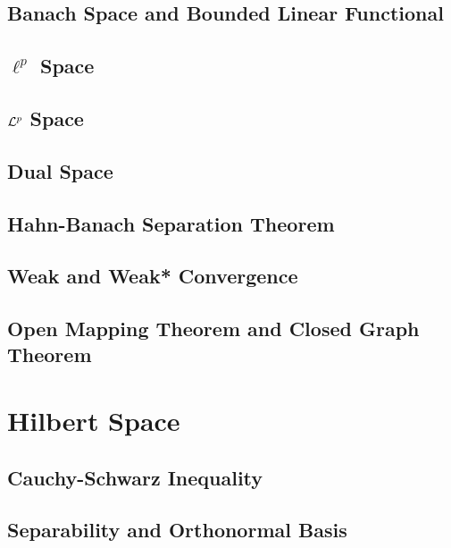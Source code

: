 \documentclass[a4paper, 12pt]{article}
\begin{document}
\subsection{Banach Space and Bounded Linear Functional}

\newpage

\subsection{$\ell^p$ Space}

\newpage

\subsection{$\mathcal{L}^p$ Space}

\newpage

\subsection{Dual Space}

\newpage

\subsection{Hahn-Banach Separation Theorem}

\newpage

\subsection{Weak and Weak* Convergence}

\newpage

\subsection{Open Mapping Theorem and Closed Graph Theorem}

\newpage

\section{Hilbert Space}

\subsection{Cauchy-Schwarz Inequality}

\newpage

\subsection{Separability and Orthonormal Basis}

\newpage
\end{document}
